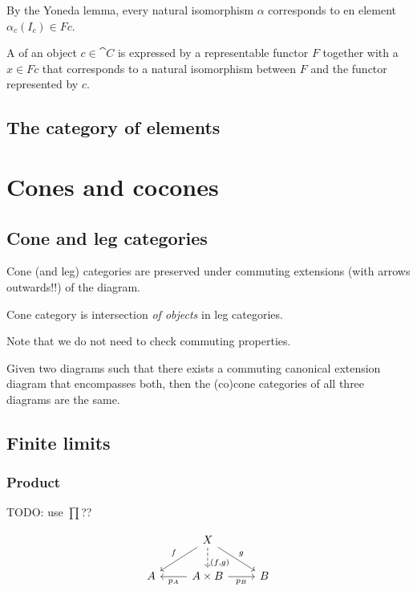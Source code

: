 By the Yoneda lemma, every natural isomorphism $\alpha$ corresponds to en element $\alpha_c(I_c) \in Fc$.
\begin{definition}
A  of an object $c\in \cat{C}$ is expressed by a representable functor $F$ together with a  $x\in Fc$ that corresponds to a natural isomorphism between $F$ and the functor represented by $c$.
\end{definition}
\section{The category of elements}
\chapter{Cones and cocones}

\section{Cone and leg categories}
\begin{proposition}
Cone (and leg) categories are preserved under commuting extensions (with arrows outwards!!) of the diagram.
\end{proposition}

\begin{proposition}
Cone category is intersection \emph{of objects} in leg categories.
\end{proposition}
Note that we do not need to check commuting properties.

\begin{corollary}
Given two diagrams such that there exists a commuting canonical extension diagram that encompasses both, then the (co)cone categories of all three diagrams are the same.
\end{corollary}

\section{Finite limits}
\subsection{Product}
TODO: use $\prod$??

\[ \begin{tikzcd}
& X \arrow[d, dashed, near end, "{(f,g)}"] \arrow[dl, swap, "f"] \arrow[dr, "g"] & \\
A & A\times B \arrow[l, "{p_A}"] \arrow[r, swap, "{p_B}"] & B
\end{tikzcd} \]

